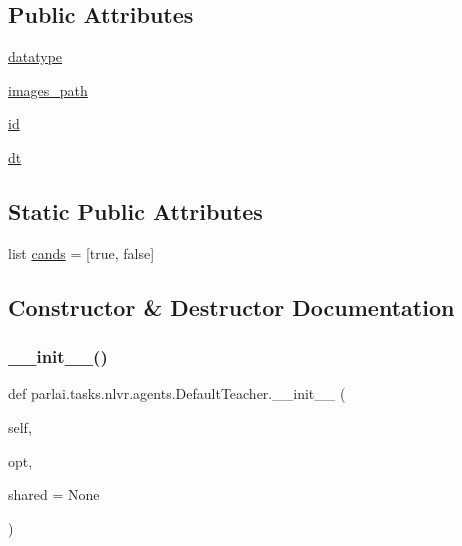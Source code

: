 \subsection*{Public Attributes}
\begin{DoxyCompactItemize}
\item 
\hyperlink{classparlai_1_1tasks_1_1nlvr_1_1agents_1_1DefaultTeacher_a0d82ff42ca2bdc37d2cc0dde80dc67ef}{datatype}
\item 
\hyperlink{classparlai_1_1tasks_1_1nlvr_1_1agents_1_1DefaultTeacher_a2f3e63f887c9884ac7d12aee734c9a19}{images\+\_\+path}
\item 
\hyperlink{classparlai_1_1tasks_1_1nlvr_1_1agents_1_1DefaultTeacher_a7809defc508b35dd2fcaae25173db4a6}{id}
\item 
\hyperlink{classparlai_1_1tasks_1_1nlvr_1_1agents_1_1DefaultTeacher_a6473aea8efc0cffb97b718bb024207ac}{dt}
\end{DoxyCompactItemize}
\subsection*{Static Public Attributes}
\begin{DoxyCompactItemize}
\item 
list \hyperlink{classparlai_1_1tasks_1_1nlvr_1_1agents_1_1DefaultTeacher_a527b12f02b10d05be6ec782cd57c3b22}{cands} = \mbox{[}\textquotesingle{}true\textquotesingle{}, \textquotesingle{}false\textquotesingle{}\mbox{]}
\end{DoxyCompactItemize}


\subsection{Constructor \& Destructor Documentation}
\mbox{\label{classparlai_1_1tasks_1_1nlvr_1_1agents_1_1DefaultTeacher_a5d4a9625d4bd1de73a9815bb791da051}} 
\subsubsection{\texorpdfstring{\+\_\+\+\_\+init\+\_\+\+\_\+()}{\_\_init\_\_()}}
{\footnotesize\ttfamily def parlai.\+tasks.\+nlvr.\+agents.\+Default\+Teacher.\+\_\+\+\_\+init\+\_\+\+\_\+ (\begin{DoxyParamCaption}\item[{}]{self,  }\item[{}]{opt,  }\item[{}]{shared = {\ttfamily None} }\end{DoxyParamCaption})}



